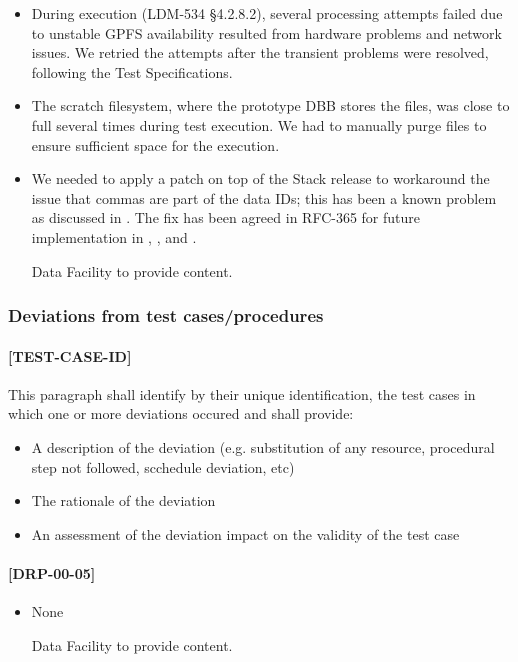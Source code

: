 \documentclass[DM,lsstdraft,STR,toc]{lsstdoc}
\begin{document}
\begin{itemize}
  \item During execution (LDM-534 \S 4.2.8.2), several processing
	attempts failed due to unstable GPFS availability resulted
	from hardware problems and network issues. We retried the
	attempts after the transient problems were resolved, following
	the Test Specifications.
  \item The scratch filesystem, where the prototype DBB stores the
	files, was close to full several times during test execution.
	We had to manually purge files to ensure sufficient space
	for the execution.
  \item We needed to apply a patch on top of the Stack release to
	workaround the issue that commas are part of the data IDs;
	this has been a known problem as discussed in .
	The fix has been agreed in RFC-365 for future implementation
	in , , and .
\begin{note}
Data Facility to provide content.
\end{note}
\end{itemize}

\subsubsection{Deviations from test cases/procedures}
\paragraph{[TEST-CASE-ID]}
This paragraph shall identify by their unique identification, the test cases in which one or more deviations occured and shall provide:
\begin{itemize}
\item A description of the deviation (e.g. substitution of any resource, procedural step not followed, scchedule deviation, etc)
\item The rationale of the deviation
\item An assessment of the deviation impact on the validity of the test case
\end{itemize}

\paragraph{[DRP-00-05]}
\begin{itemize}
  \item None
\begin{note}
Data Facility to provide content.
\end{note}
\end{itemize}
\end{document}
